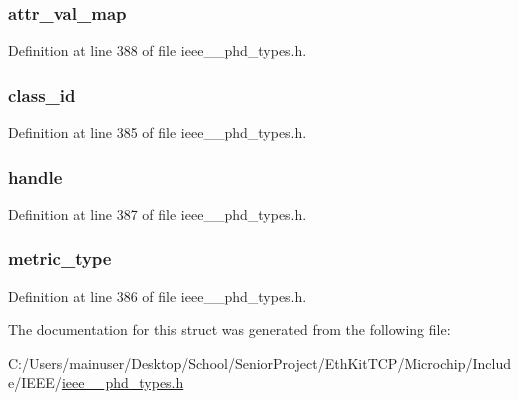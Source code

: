 \subsubsection[{attr\+\_\+val\+\_\+map}]{ attr\+\_\+val\+\_\+map}\label{struct___segm_entry_elem_af0de5a153ac1e3ed23cc9a8010d054fc}


Definition at line 388 of file ieee\+\_\+\_\+phd\+\_\+types.\+h.

\hypertarget{struct___segm_entry_elem_ad0a510237949ff545815366adea89f8b}{}
\subsubsection[{class\+\_\+id}]{ class\+\_\+id}\label{struct___segm_entry_elem_ad0a510237949ff545815366adea89f8b}


Definition at line 385 of file ieee\+\_\+\_\+phd\+\_\+types.\+h.

\hypertarget{struct___segm_entry_elem_a07ff1fa563f3d58110ce80c3c1796f9b}{}
\subsubsection[{handle}]{ handle}\label{struct___segm_entry_elem_a07ff1fa563f3d58110ce80c3c1796f9b}


Definition at line 387 of file ieee\+\_\+\_\+phd\+\_\+types.\+h.

\hypertarget{struct___segm_entry_elem_a34ce56177f5504256755d9e1d12f4435}{}
\subsubsection[{metric\+\_\+type}]{ metric\+\_\+type}\label{struct___segm_entry_elem_a34ce56177f5504256755d9e1d12f4435}


Definition at line 386 of file ieee\+\_\+\_\+phd\+\_\+types.\+h.



The documentation for this struct was generated from the following file\+:\begin{DoxyCompactItemize}
\item 
C\+:/\+Users/mainuser/\+Desktop/\+School/\+Senior\+Project/\+Eth\+Kit\+T\+C\+P/\+Microchip/\+Include/\+I\+E\+E\+E/\hyperlink{ieee__11073__phd__types_8h}{ieee\+\_\+\_\+phd\+\_\+types.\+h}\end{DoxyCompactItemize}
